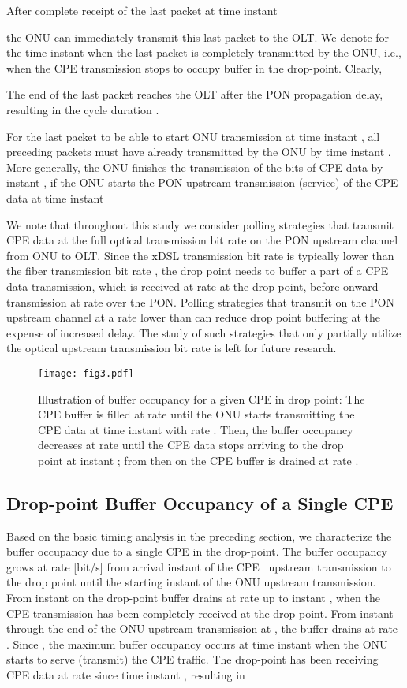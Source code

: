 \documentclass[pdftex,journal]{IEEEtran}
\begin{document}
After complete receipt of the last packet at time instant

the ONU can immediately transmit this last packet
to the OLT. We denote  for the time instant when
the last packet is completely transmitted by the ONU, i.e.,
when the CPE transmission stops to occupy buffer in the drop-point.
Clearly,

The end of the last packet reaches the OLT after the PON propagation delay,
resulting in the cycle duration .

For the last packet to be able to start ONU transmission at time instant
, all preceding packets must have already transmitted
by the ONU by time instant .
More generally, the ONU finishes the transmission of the
 bits of CPE data by instant ,
if the ONU starts the PON upstream transmission
(service) of the CPE data at time instant


We note that throughout this study we consider polling strategies
that transmit CPE data at the full optical transmission bit rate
 on the PON upstream channel from ONU to OLT. Since the xDSL
transmission bit rate  is typically lower than the fiber
transmission bit rate , the drop point needs to buffer a part
of a CPE data transmission, which is received at rate  at
the drop point, before onward transmission at rate  over the
PON. Polling strategies that transmit on the PON upstream channel at
a rate lower than  can reduce drop point buffering at the
expense of increased delay. The study of such strategies that only
partially utilize the optical upstream transmission bit rate is left
for future research.


\begin{figure}[t]
\centering
\texttt{[image: fig3.pdf]}
\caption{Illustration of buffer occupancy for a given CPE  in drop point:
The CPE buffer is filled at rate  until the ONU starts transmitting
the CPE data at time instant  with rate . Then,
the buffer occupancy decreases at rate  until the CPE data stops
arriving to the drop point at instant ; from then on the
CPE buffer is drained at rate .}
\label{fig:hill}
\end{figure}
\subsection{Drop-point Buffer Occupancy of a Single CPE}
\label{bufsingleCPE:sec}
Based on the basic timing analysis in the preceding section,
we characterize the buffer occupancy due to a single CPE 
in the drop-point.
The buffer occupancy grows at rate  [bit/s]
from arrival instant  of the CPE~ upstream transmission to
the drop point until the starting instant  of the ONU upstream
transmission.
From instant  on the drop-point buffer drains at
rate  up to instant ,
when the CPE transmission has been completely received at the drop-point.
From instant  through the end of the ONU upstream transmission
at , the buffer drains at rate .
Since , the maximum buffer occupancy  occurs
at time instant  when the ONU starts to serve (transmit)
the CPE traffic.
The drop-point has been receiving CPE data at rate  since time instant
, resulting in
\end{document}
